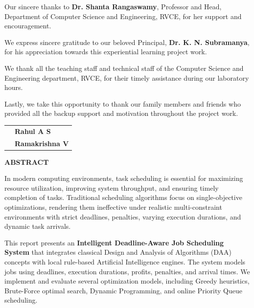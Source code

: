 \documentclass[12pt,a4paper]{article}
\begin{document}
\noindent
Our sincere thanks to \textbf{Dr. Shanta Rangaswamy}, Professor and Head, Department of Computer Science and Engineering, RVCE, for her support and encouragement.

\noindent
We express sincere gratitude to our beloved Principal, \textbf{Dr. K. N. Subramanya}, for his appreciation towards this experiential learning project work.

\noindent
We thank all the teaching staff and technical staff of the Computer Science and Engineering department, RVCE, for their timely assistance during our laboratory hours.

\noindent
Lastly, we take this opportunity to thank our family members and friends who provided all the backup support and motivation throughout the project work.

\vspace{2cm}
\noindent
\begin{tabular}{p{7cm}p{7cm}}
    & \textbf{Rahul A S} \\
    & \textbf{Ramakrishna V}
\end{tabular}

\newpage

\tableofcontents
\newpage
\listoffigures
\listoftables
\newpage


\begin{center}
    \Large \textbf{ABSTRACT}
\end{center}
\noindent
In modern computing environments, task scheduling is essential for maximizing resource utilization, improving system throughput, and ensuring timely completion of tasks. Traditional scheduling algorithms focus on single-objective optimizations, rendering them ineffective under realistic multi-constraint environments with strict deadlines, penalties, varying execution durations, and dynamic task arrivals.

\noindent
This report presents an \textbf{Intelligent Deadline-Aware Job Scheduling System} that integrates classical Design and Analysis of Algorithms (DAA) concepts with local rule-based Artificial Intelligence engines. The system models jobs using deadlines, execution durations, profits, penalties, and arrival times. We implement and evaluate several optimization models, including Greedy heuristics, Brute-Force optimal search, Dynamic Programming, and online Priority Queue scheduling. 
\end{document}
